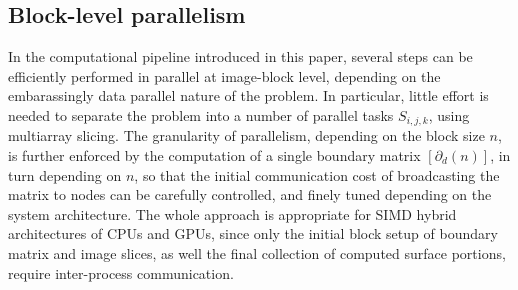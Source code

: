 \subsection{Block-level parallelism}\label{sec:bbbb}

In the computational pipeline introduced in this paper, several steps can be efficiently performed in parallel at image-block level, depending on the embarassingly data parallel nature of the problem. In particular, little effort is needed to separate the problem into a number of parallel tasks $S_{i,j,k}$, using multiarray slicing. The granularity of parallelism, depending on the block size $n$, is further enforced by the computation of a single boundary matrix $[\partial_d(n)]$, in turn depending on $n$, so that the initial communication cost of broadcasting the matrix to nodes can be carefully controlled, and finely tuned depending on the system architecture. The whole approach is appropriate  for SIMD hybrid architectures of CPUs and GPUs, since only the initial block setup of boundary matrix and image slices, as well the final collection of computed surface portions, require inter-process communication.



